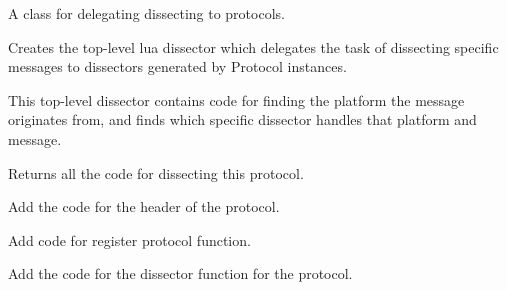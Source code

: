\documentclass[A4paper,10pt,english]{sphinxmanual}
\begin{document}

\begin{fulllineitems}
\label{devel/code:dissector.Delegator}
A class for delegating dissecting to protocols.

Creates the top-level lua dissector which delegates the task
of dissecting specific messages to dissectors generated by
Protocol instances.

This top-level dissector contains code for finding the platform
the message originates from, and finds which specific dissector
handles that platform and message.

\begin{fulllineitems}
\label{devel/code:dissector.Delegator.generate}
Returns all the code for dissecting this protocol.

\end{fulllineitems}


\begin{fulllineitems}
\label{devel/code:dissector.Delegator._header_defintion}
Add the code for the header of the protocol.

\end{fulllineitems}


\begin{fulllineitems}
\label{devel/code:dissector.Delegator._register_function}
Add code for register protocol function.

\end{fulllineitems}


\begin{fulllineitems}
\label{devel/code:dissector.Delegator._dissector_func}
Add the code for the dissector function for the protocol.

\end{fulllineitems}


\end{fulllineitems}
\end{document}
